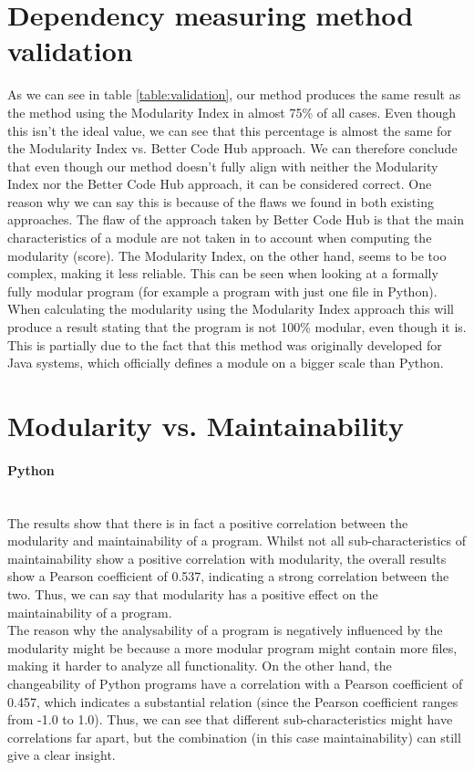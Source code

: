 \documentclass[twoside]{uva-inf-bachelor-thesis}
\newcommand{\myparagraph}[1]{\paragraph{#1}\mbox{}\\}
\begin{document}
\section{Dependency measuring method validation}
As we can see in table \ref{table:validation}, our method produces the same result as the method using the Modularity Index in almost 75\% of all cases. Even though this isn't the ideal value, we can see that this percentage is almost the same for the Modularity Index vs. Better Code Hub approach. We can therefore conclude that even though our method doesn't fully align with neither the Modularity Index nor the Better Code Hub approach, it can be considered correct. One reason why we can say this is because of the flaws we found in both existing approaches. The flaw of the approach taken by Better Code Hub is that the main characteristics of a module are not taken in to account when computing the modularity (score). The Modularity Index, on the other hand, seems to be too complex, making it less reliable. This can be seen when looking at a formally fully modular program (for example a program with just one file in Python). When calculating the modularity using the Modularity Index approach this will produce a result stating that the program is not 100\% modular, even though it is. This is partially due to the fact that this method was originally developed for Java systems, which officially defines a module on a bigger scale than Python.

\section{Modularity vs. Maintainability}
\myparagraph{Python}
The results show that there is in fact a positive correlation between the modularity and maintainability of a program. Whilst not all sub-characteristics of maintainability show a positive correlation with modularity, the overall results show a Pearson coefficient of 0.537, indicating a strong correlation between the two. Thus, we can say that modularity has a positive effect on the maintainability of a program.\\

The reason why the analysability of a program is negatively influenced by the modularity might be because a more modular program might contain more files, making it harder to analyze all functionality. On the other hand, the changeability of Python programs have a correlation with a Pearson coefficient of 0.457, which indicates a substantial relation (since the Pearson coefficient ranges from -1.0 to 1.0). Thus, we can see that different sub-characteristics might have correlations far apart, but the combination (in this case maintainability) can still give a clear insight.
\end{document}
